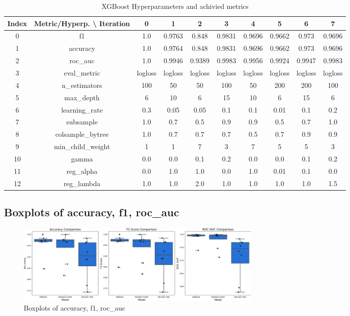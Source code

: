 \documentclass{article}%
\begin{document}
\begin{table}[h!]%
\caption{XGBoost Hyperparameters and achivied metrics}%
\vspace{0.2cm}%
\centering%
\begin{tabular}{|c||c||c||c||c||c||c||c||c||c|}%
\hline%
Index&Metric/Hyperp. \textbackslash{} Iteration&0&1&2&3&4&5&6&7\\%
\hline%
0&f1&1.0&0.9763&0.848&0.9831&0.9696&0.9662&0.973&0.9696\\%
1&accuracy&1.0&0.9764&0.848&0.9831&0.9696&0.9662&0.973&0.9696\\%
2&roc\_auc&1.0&0.9946&0.9389&0.9983&0.9956&0.9924&0.9947&0.9983\\%
3&eval\_metric&logloss&logloss&logloss&logloss&logloss&logloss&logloss&logloss\\%
4&n\_estimators&100&50&50&100&50&200&200&100\\%
5&max\_depth&6&10&6&15&10&6&15&6\\%
6&learning\_rate&0.3&0.05&0.05&0.1&0.1&0.01&0.1&0.2\\%
7&subsample&1.0&0.7&0.5&0.9&0.9&0.5&0.7&1.0\\%
8&colsample\_bytree&1.0&0.7&0.7&0.7&0.5&0.7&0.9&0.9\\%
9&min\_child\_weight&1&1&7&3&7&5&5&3\\%
10&gamma&0.0&0.0&0.1&0.2&0.0&0.0&0.1&0.2\\%
11&reg\_alpha&0.0&1.0&1.0&0.0&1.0&0.01&0.1&0.0\\%
12&reg\_lambda&1.0&1.0&2.0&1.0&1.0&1.0&1.0&1.5\\%
\hline%
\end{tabular}%
\end{table}

%
\newpage%
\subsection{Boxplots of accuracy, f1, roc\_auc}%
\label{subsec:Boxplotsofaccuracy,f1,rocauc}%


\begin{figure}[h!]%
\centering%
\includegraphics[width=460px]{ModelOptimization/box_plots_metrics.png}%
\caption{Boxplots of accuracy, f1, roc\_auc}%
\end{figure}
\end{document}

